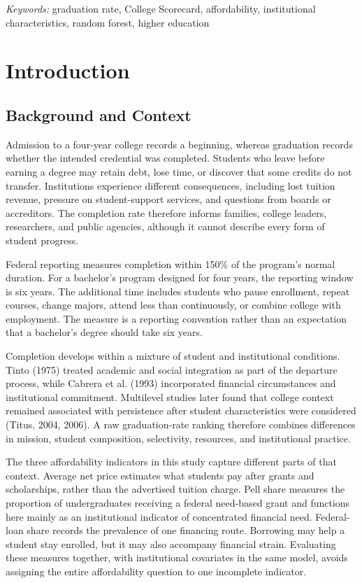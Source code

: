 \documentclass[12pt,a4paper]{article}
\begin{document}
\noindent\textit{Keywords:} graduation rate, College Scorecard, affordability, institutional characteristics, random forest, higher education

\clearpage
\begingroup
\singlespacing
\tableofcontents
\endgroup
\clearpage

\section{Introduction}

\subsection{Background and Context}

Admission to a four-year college records a beginning, whereas graduation records whether the intended credential was completed. Students who leave before earning a degree may retain debt, lose time, or discover that some credits do not transfer. Institutions experience different consequences, including lost tuition revenue, pressure on student-support services, and questions from boards or accreditors. The completion rate therefore informs families, college leaders, researchers, and public agencies, although it cannot describe every form of student progress.

Federal reporting measures completion within 150\% of the program's normal duration. For a bachelor's program designed for four years, the reporting window is six years. The additional time includes students who pause enrollment, repeat courses, change majors, attend less than continuously, or combine college with employment. The measure is a reporting convention rather than an expectation that a bachelor's degree should take six years.

Completion develops within a mixture of student and institutional conditions. Tinto (1975) treated academic and social integration as part of the departure process, while Cabrera et al. (1993) incorporated financial circumstances and institutional commitment. Multilevel studies later found that college context remained associated with persistence after student characteristics were considered (Titus, 2004, 2006). A raw graduation-rate ranking therefore combines differences in mission, student composition, selectivity, resources, and institutional practice.

The three affordability indicators in this study capture different parts of that context. Average net price estimates what students pay after grants and scholarships, rather than the advertised tuition charge. Pell share measures the proportion of undergraduates receiving a federal need-based grant and functions here mainly as an institutional indicator of concentrated financial need. Federal-loan share records the prevalence of one financing route. Borrowing may help a student stay enrolled, but it may also accompany financial strain. Evaluating these measures together, with institutional covariates in the same model, avoids assigning the entire affordability question to one incomplete indicator.
\end{document}
